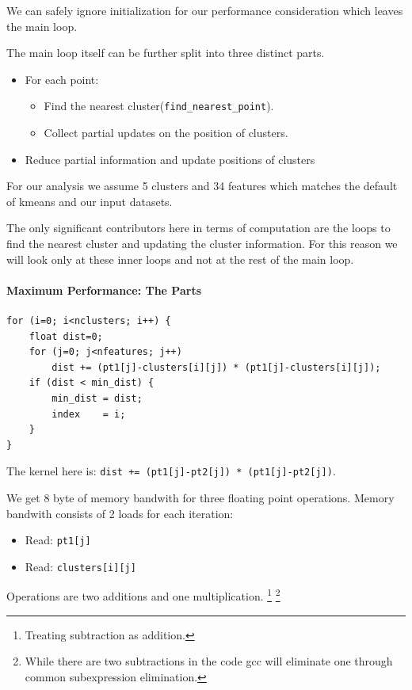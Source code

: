 We can safely ignore initialization for our performance consideration which leaves the main loop.

The main loop itself can be further split into three distinct parts.
\begin{itemize}
	\item For each point:
	\begin{itemize}
		\item Find the nearest cluster(\texttt{find\_nearest\_point}).
		\item Collect partial updates on the position of clusters.
	\end{itemize}
	\item Reduce partial information and update positions of clusters 	
\end{itemize}

For our analysis we assume 5 clusters and 34 features which matches
the default of kmeans and our input datasets.

The only significant contributors here in terms of computation are the loops to find the nearest cluster and updating the cluster information.
For this reason we will look only at these inner loops and not at the rest of the main loop.

\paragraph{Maximum Performance: The Parts}
\begin{lstlisting}[caption={Inlined representation of find\_nearest\_point}]
for (i=0; i<nclusters; i++) {
	float dist=0;
	for (j=0; j<nfeatures; j++)
		dist += (pt1[j]-clusters[i][j]) * (pt1[j]-clusters[i][j]);
	if (dist < min_dist) {
		min_dist = dist;
		index    = i;
	}
}
\end{lstlisting}
The kernel here is:
\texttt{dist += (pt1[j]-pt2[j]) * (pt1[j]-pt2[j])}.\newline

We get 8 byte of memory bandwith for three floating point operations.
Memory bandwith consists of 2 loads for each iteration:
\begin{itemize}
	\item Read: \texttt{pt1[j]}
	\item Read: \texttt{clusters[i][j]}
\end{itemize}
Operations are two additions and one multiplication.
\footnote{Treating subtraction as addition.}
\footnote{While there are two subtractions in the code gcc will eliminate one through common subexpression elimination.}


